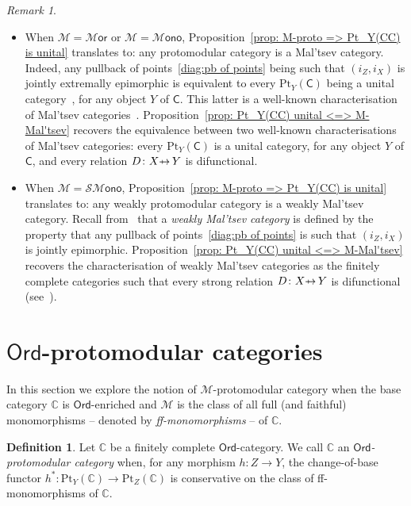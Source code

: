 \documentclass[10pt,a4paper]{amsart}
\theoremstyle{plain}
\theoremstyle{definition}
\newtheorem{definition}[subsection]{Definition}
\theoremstyle{remark}
\newtheorem{remark}[subsection]{Remark}
\newcommand{\defn}[1]{\emph{#1}}
\newcommand{\C}{\ensuremath{\mathsf{C}}}
\newcommand{\CC}{\ensuremath{\mathbb{C}}}
\newcommand{\Ord}{\ensuremath{\mathsf{Ord}}}
\newcommand{\Pt}{\ensuremath{\mathrm{Pt}}}
\newcommand{\M}{\ensuremath{\mathscr{M}}}
\def\relto{{\rightarrow\hspace*{-2.4ex}{\mapstochar}\hspace*{2.2ex}}}
\newcommand{\Mor}{\ensuremath{\mathscr{M}\mathsf{or}}}
\newcommand{\Mono}{\ensuremath{\mathscr{M}\mathsf{ono}}}
\newcommand{\SMono}{\ensuremath{\mathscr{SM}\mathsf{ono}}}
\begin{document}
\begin{remark}\label{rem: proto => Mal'tsev}
\begin{itemize}
	\item[1.] When $\M=\Mor$ or $\M=\Mono$, Proposition~\ref{prop: M-proto => Pt_Y(CC) is unital} translates to: any protomodular category is a Mal'tsev category. Indeed, any pullback of points~\eqref{diag:pb of points} being such that $(i_Z,i_X)$ is jointly extremally epimorphic is equivalent to every $\Pt_Y(\C)$ being a unital category~\cite{MCFPO}, for any object $Y$ of $\C$. This latter is a well-known characterisation of Mal'tsev categories~\cite[Proposition 10]{MCFPO}. Proposition~\ref{prop: Pt_Y(CC) unital <=> M-Mal'tsev} recovers the equivalence between two well-known characterisations of Mal'tsev categories: every $\Pt_Y(\C)$ is a unital category, for any object $Y$ of $\C$, and every relation $D\colon X\relto Y$ is difunctional.
	\item[2.] When $\M=\SMono$, Proposition~\ref{prop: M-proto => Pt_Y(CC) is unital} translates to: any weakly protomodular category is a weakly Mal'tsev category. Recall  from~\cite{NMFweakly} that a \emph{weakly Mal'tsev category} is defined by the property that any pullback of points~\eqref{diag:pb of points} is such that $(i_Z,i_X)$ is jointly epimorphic. Proposition~\ref{prop: Pt_Y(CC) unital <=> M-Mal'tsev} recovers the characterisation of weakly Mal'tsev categories as the finitely complete categories such that every strong relation $D\colon X\relto Y$ is difunctional (see~\cite{JMF}).
\end{itemize}
\end{remark}


\section{$\Ord$-protomodular categories}\label{sect:Ordproto}
In this section we explore the notion of $\M$-protomodular category when the base category $\CC$ is $\Ord$-enriched and $\M$ is the class of all full (and faithful) monomorphisms -- denoted by \defn{ff-monomorphisms} -- of $\CC$.

\begin{definition}\label{def: Ord-proto}
Let $\CC$ be a finitely complete $\Ord$-category. We call $\CC$ an \defn{$\Ord$-protomodular category} when, for any morphism $h\colon Z\to Y$, the change-of-base functor $h^*\colon \Pt_Y(\CC)\to \Pt_Z(\CC)$ is conservative on the class of ff-monomorphisms of $\CC$.
\end{definition}
\end{document}

